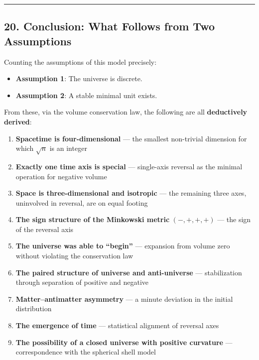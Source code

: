 \documentclass[a4paper,11pt]{article}
\theoremstyle{definition}
\providecommand{\tightlist}{\setlength{\itemsep}{0pt}\setlength{\parskip}{0pt}}
\begin{document}
\begin{center}\rule{0.5\linewidth}{0.5pt}\end{center}

\subsection{20. Conclusion: What Follows from Two
Assumptions}\label{conclusion-what-follows-from-two-assumptions}

Counting the assumptions of this model precisely:

\begin{itemize}
\tightlist
\item
  \textbf{Assumption 1}: The universe is discrete.
\item
  \textbf{Assumption 2}: A stable minimal unit exists.
\end{itemize}

From these, via the volume conservation law, the following are all
\textbf{deductively derived}:

\begin{enumerate}
\def\labelenumi{\arabic{enumi}.}
\tightlist
\item
  \textbf{Spacetime is four-dimensional} --- the smallest non-trivial
  dimension for which \(\sqrt{n}\) is an integer
\item
  \textbf{Exactly one time axis is special} --- single-axis reversal as
  the minimal operation for negative volume
\item
  \textbf{Space is three-dimensional and isotropic} --- the remaining
  three axes, uninvolved in reversal, are on equal footing
\item
  \textbf{The sign structure of the Minkowski metric} \((-,+,+,+)\) ---
  the sign of the reversal axis
\item
  \textbf{The universe was able to ``begin''} --- expansion from volume
  zero without violating the conservation law
\item
  \textbf{The paired structure of universe and anti-universe} ---
  stabilization through separation of positive and negative
\item
  \textbf{Matter--antimatter asymmetry} --- a minute deviation in the
  initial distribution
\item
  \textbf{The emergence of time} --- statistical alignment of reversal
  axes
\item
  \textbf{The possibility of a closed universe with positive curvature}
  --- correspondence with the spherical shell model
\end{enumerate}
\end{document}
